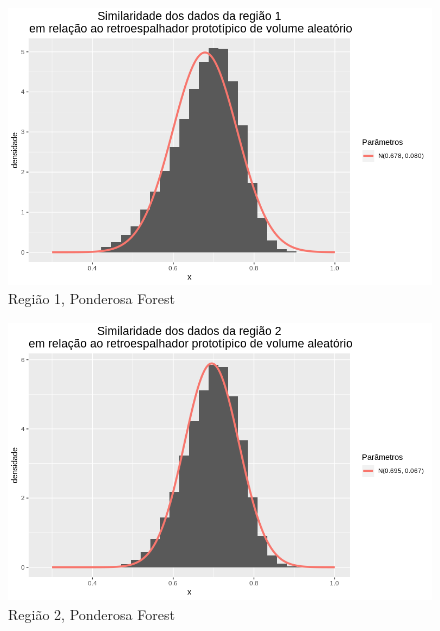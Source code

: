 \documentclass[12pt]{article}
\begin{document}
\begin{figure}[!h]
    \centering
    \vspace{0.15\linewidth}
    \includegraphics[width = 0.95\linewidth]{../../Images/Report_18_12_20/ponder_rv_region1.png}
    \caption{Região 1, Ponderosa Forest}
    \label{fig:pond_rv_r1}
\end{figure}

\begin{figure}[!h]
    \centering
    \vspace{0.1\linewidth}
    \includegraphics[width = 0.95\linewidth]{../../Images/Report_18_12_20/ponder_rv_region2.png}
    \caption{Região 2, Ponderosa Forest}
    \label{fig:pond_rv_r2}
\end{figure}
\end{document}
